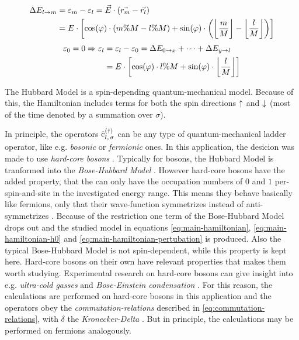 \begin{equation}
    \label{eq:energy-difference-hopping}
    \begin{split}
        \Delta E_{l \rightarrow m} &=  \epsl[m] - \epsl[l] = \vec{E} \cdot \left(\vec{r_m}-\vec{r_l}\right)\\
        &= E \cdot \left[\cos(\varphi)\cdot \left(m \% M-l \% M\right) + \sin(\varphi)\cdot \left(\floor[\bigg]{\frac{m}{M}}-\floor[\bigg]{\frac{l}{M}}\right)\right]
    \end{split}
\end{equation}
\vspace{0.5cm} %
\begin{equation}
    \label{eq:epsl}
    \begin{split}
        \epsl[0] = 0 \Rightarrow
        \epsl[l] &= \epsl[l] - \epsl[0] = \Delta E_{0 \rightarrow x} + \dots + \Delta E_{y \rightarrow l}\\
        &= E \cdot \left[\cos(\varphi)\cdot l \% M + \sin(\varphi)\cdot \floor[\bigg]{\frac{l}{M}}\right]
    \end{split}
\end{equation}

The Hubbard Model \cite{hubbardModelOriginalDerivation} is a spin-depending quantum-mechanical model. 
Because of this, the Hamiltonian includes terms for both the spin directions $\up$ and $\down$ (most of the time denoted by a summation over $\sigma$).

In principle, the operators $\withspinop[]{l}{\sigma}{(\dagger)}$ can be any type of quantum-mechanical ladder operator, like e.g. \emph{bosonic} or \emph{fermionic} ones.
In this application, the desicion was made to use \emph{hard-core bosons} \cite[]{hardCoreBosonsBasics}.
Typically for bosons, the Hubbard Model is tranformed into the \emph{Bose-Hubbard Model} \cite{boseHubbardModelOriginalDerivation}.
However hard-core bosons have the added property, that the can only have the occupation numbers of $0$ and $1$ per-spin-and-site in the investigated energy range.
This means they behave basically like fermions, only that their wave-function symmetrizes instead of anti-symmetrizes \cite{schwablBook}.
Because of the restriction one term of the Bose-Hubbard Model drops out and the studied model in equations \ref{eq:main-hamiltonian}, \ref{eq:main-hamiltonian-h0} and \ref{eq:main-hamiltonian-pertubation} is produced.
Also the typical Bose-Hubbard Model is not spin-dependent, while this property is kept here.
Hard-core bosons on their own have relevant properties that makes them worth studying. 
Experimental research on hard-core bosons can give insight into e.g. \emph{ultra-cold gasses} and \emph{Bose-Einstein condensation} \cite{hardCoreBosonsBasics}.
For this reason, the calculations are performed on hard-core bosons in this application and the operators obey the \emph{commutation-relations} described in \autoref{eq:commutation-relations}, with $\delta$ the \emph{Kronecker-Delta} \cite{schwablBookII}. 
But in principle, the calculations may be performed on fermions analogously. 


